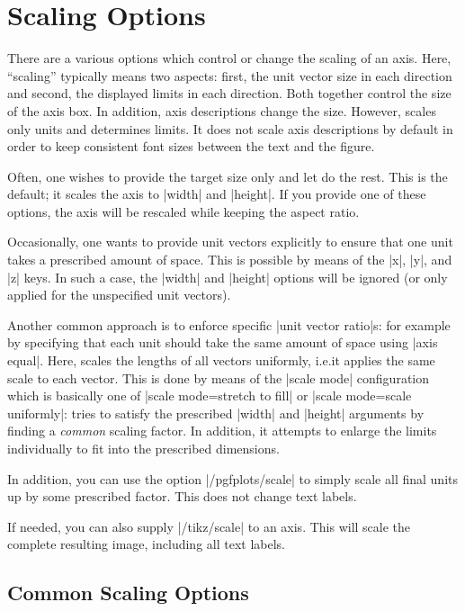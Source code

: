 
\section{Scaling Options}

There are a various options which control or change the scaling of an axis.
Here, ``scaling'' typically means two aspects: first, the unit vector size in
each direction and second, the displayed limits in each direction. Both
together control the size of the axis box. In addition, axis descriptions
change the size. However, \PGFPlots{} scales only units and determines limits.
It does not scale axis descriptions by default in order to keep consistent font
sizes between the text and the figure.

Often, one wishes to provide the target size only and let \PGFPlots{} do the
rest. This is the default; it scales the axis to |width| and |height|. If you
provide one of these options, the axis will be rescaled while keeping the
aspect ratio.

Occasionally, one wants to provide unit vectors explicitly to ensure that one
unit takes a prescribed amount of space. This is possible by means of the |x|,
|y|, and |z| keys. In such a case, the |width| and |height| options will be
ignored (or only applied for the unspecified unit vectors).

Another common approach is to enforce specific |unit vector ratio|s: for
example by specifying that each unit should take the same amount of space using
|axis equal|. Here, \PGFPlots{} scales the lengths of all vectors uniformly,
i.e.\@ it applies the same scale to each vector. This is done by means of the
|scale mode| configuration which is basically one of
|scale mode=stretch to fill| or |scale mode=scale uniformly|: \PGFPlots{} tries
to satisfy the prescribed |width| and |height| arguments by finding a
\emph{common} scaling factor. In addition, it attempts to enlarge the limits
individually to fit into the prescribed dimensions.

In addition, you can use the option |/pgfplots/scale| to simply scale all final
units up by some prescribed factor. This does not change text labels.

If needed, you can also supply |/tikz/scale| to an axis. This will scale the
complete resulting image, including all text labels.


\subsection{Common Scaling Options}

